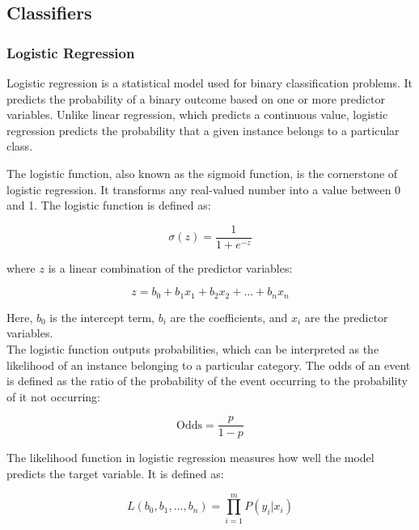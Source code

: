 \subsection{Classifiers}

\subsubsection{Logistic Regression}
Logistic regression is a statistical model used for binary classification problems. It predicts the probability of a binary outcome based on one or more predictor variables. Unlike linear regression, which predicts a continuous value, logistic regression predicts the probability that a given instance belongs to a particular class.

The logistic function, also known as the sigmoid function, is the cornerstone of logistic regression. It transforms any real-valued number into a value between 0 and 1. The logistic function is defined as:

\begin{equation*}
    \sigma(z) = \frac{1}{1 + e^{-z}}
\end{equation*}

where \(z\) is a linear combination of the predictor variables:

\begin{equation*}
    z = b_0 + b_1x_1 + b_2x_2 + \ldots + b_nx_n
\end{equation*}

Here, \(b_0\) is the intercept term, \(b_i\) are the coefficients, and \(x_i\) are the predictor variables.\\

The logistic function outputs probabilities, which can be interpreted as the likelihood of an instance belonging to a particular category. The odds of an event is defined as the ratio of the probability of the event occurring to the probability of it not occurring:

\begin{equation*}
    \text{Odds} = \frac{p}{1-p}
\end{equation*}

The likelihood function in logistic regression measures how well the model predicts the target variable. It is defined as:

\begin{equation*}
    L(b_0, b_1, \ldots, b_n) = \prod_{i=1}^{m} P(y_i|x_i)
\end{equation*}

